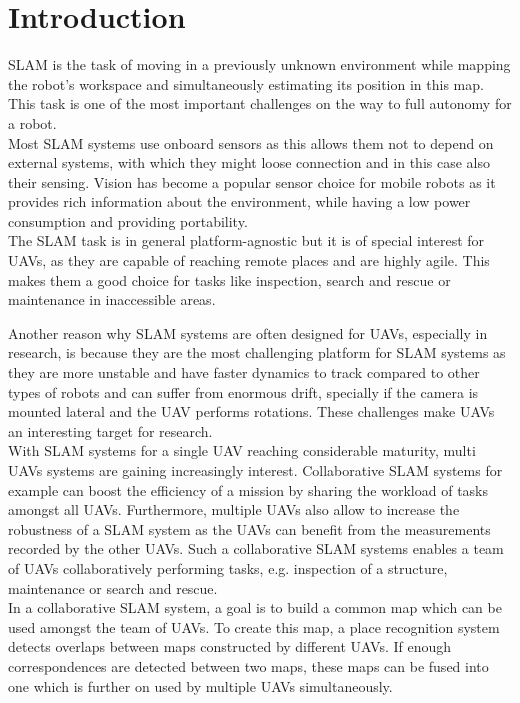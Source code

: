 \chapter{Introduction}
\label{sec:introduction}

\acf{SLAM} is the task of moving in a previously unknown environment while mapping the robot’s workspace and simultaneously estimating its position in this map. This task is one of the most important challenges on the way to full autonomy for a robot.\\

Most \ac{SLAM} systems use onboard sensors as this allows them not to depend on external systems, with which they might loose connection and in this case also their sensing. Vision has become a popular sensor choice for mobile robots as it provides rich information about the environment, while having a low power consumption and providing portability.\\

The \ac{SLAM} task is in general platform-agnostic but it is of special interest for \acfp{UAV}, as they are capable of reaching remote places and are highly agile. This makes them a good choice for tasks like inspection, search and rescue or maintenance in inaccessible areas. 

Another reason why \ac{SLAM} systems are often designed for \acp{UAV}, especially in research, is because they are the most challenging platform for \ac{SLAM} systems as they are more unstable and have faster dynamics to track compared to other types of robots and can suffer from enormous drift, specially if the camera is mounted lateral and the \ac{UAV} performs rotations. These challenges make \acp{UAV} an interesting target for research.\\

With \ac{SLAM} systems for a single \ac{UAV} reaching considerable maturity, multi \acp{UAV} systems are gaining increasingly interest. Collaborative \ac{SLAM} systems for example can boost the efficiency of a mission by sharing the workload of tasks amongst all \acp{UAV}. Furthermore, multiple \acp{UAV} also allow to increase the robustness of a \ac{SLAM} system as the \acp{UAV} can benefit from the measurements recorded by the other \acp{UAV}. Such a collaborative \ac{SLAM} systems enables a team of \acp{UAV} collaboratively performing tasks, e.g. inspection of a structure, maintenance or search and rescue.\\

In a collaborative \ac{SLAM} system, a goal is to build a common map which can be used amongst the team of \acp{UAV}. To create this map, a place recognition system detects overlaps between maps constructed by different \acp{UAV}. If enough correspondences are detected between two maps, these maps can be fused into one which is further on used by multiple \acp{UAV} simultaneously.\\

